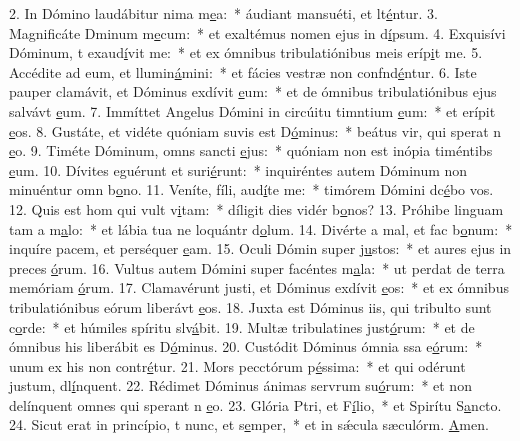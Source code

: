 2. In Dómino laudábitur nima m\uline{e}a:~* áudiant mansuéti, et lt\uline{é}ntur.
3. Magnificáte Dminum m\uline{e}cum:~* et exaltémus nomen ejus in d\uline{í}psum.
4. Exquisívi Dóminum, t exaud\uline{í}vit me:~* et ex ómnibus tribulatiónibus meis eríp\uline{i}t me.
5. Accédite ad eum, et llumin\uline{á}mini:~* et fácies vestræ non confnd\uline{é}ntur.
6. Iste pauper clamávit, et Dóminus exdívit \uline{e}um:~* et de ómnibus tribulatiónibus ejus salvávt \uline{e}um.
7. Immíttet Angelus Dómini in circúitu timntium \uline{e}um:~* et erípit \uline{e}os.
8. Gustáte, et vidéte quóniam suvis est D\uline{ó}minus:~* beátus vir, qui sperat n \uline{e}o.
9. Timéte Dóminum, omns sancti \uline{e}jus:~* quóniam non est inópia timéntibs \uline{e}um.
10. Dívites eguérunt et suri\uline{é}runt:~* inquiréntes autem Dóminum non minuéntur omn b\uline{o}no.
11. Veníte, fíli, aud\uline{í}te me:~* timórem Dómini dc\uline{é}bo vos.
12. Quis est hom qui vult v\uline{i}tam:~* díligit dies vidér b\uline{o}nos?
13. Próhibe linguam tam a m\uline{a}lo:~* et lábia tua ne loquántr d\uline{o}lum.
14. Divérte a mal, et fac b\uline{o}num:~* inquíre pacem, et perséquer \uline{e}am.
15. Oculi Dómin super j\uline{u}stos:~* et aures ejus in preces \uline{ó}rum.
16. Vultus autem Dómini super facéntes m\uline{a}la:~* ut perdat de terra memóriam \uline{ó}rum.
17. Clamavérunt justi, et Dóminus exdívit \uline{e}os:~* et ex ómnibus tribulatiónibus eórum liberávt \uline{e}os.
18. Juxta est Dóminus iis, qui tribulto sunt c\uline{o}rde:~* et húmiles spíritu slv\uline{á}bit.
19. Multæ tribulatines just\uline{ó}rum:~* et de ómnibus his liberábit es D\uline{ó}minus.
20. Custódit Dóminus ómnia ssa e\uline{ó}rum:~* unum ex his non contr\uline{é}tur.
21. Mors pecctórum p\uline{é}ssima:~* et qui odérunt justum, dl\uline{í}nquent.
22. Rédimet Dóminus ánimas servrum su\uline{ó}rum:~* et non delínquent omnes qui sperant n \uline{e}o.
23. Glória Ptri, et F\uline{í}lio,~* et Spirítu S\uline{a}ncto.
24. Sicut erat in princípio, t nunc, et s\uline{e}mper,~* et in sǽcula sæculórm. \uline{A}men.
